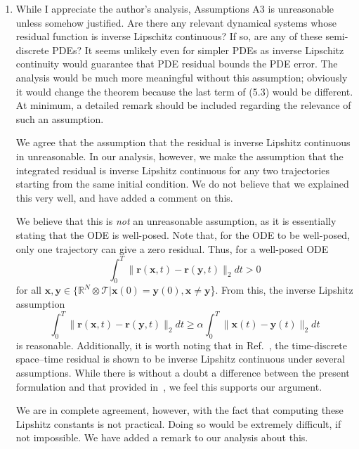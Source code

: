\documentclass[3p,computermodern,10pt]{elsarticle}
\begin{document}
\begin{enumerate}
\item While I appreciate the author's analysis, Assumptions A3 is unreasonable unless somehow justified. Are there any relevant dynamical systems whose residual function is inverse Lipschitz continuous? If so, are any of these semi-discrete PDEs? It seems unlikely even for simpler PDEs as inverse Lipschitz continuity would guarantee that PDE residual bounds the PDE error. The analysis would be much more meaningful without this assumption; obviously it would change the theorem because the last term of (5.3) would be different. At minimum, a detailed remark should be included regarding the relevance of such an assumption.

{\color{red} We agree that the assumption that the residual is inverse Lipshitz continuous in unreasonable. In our analysis, however, we make the assumption that the integrated residual is inverse Lipshitz continuous for any two trajectories starting from the same initial condition. We do not believe that we explained this very well, and have added a comment on this. 

We believe that this is \textit{not} an unreasonable assumption, as it is essentially stating that the ODE is well-posed. Note that, for the ODE to be well-posed, only one trajectory can give a zero residual. Thus, for a well-posed ODE 
$$ \int_0^T \| \boldsymbol r(\boldsymbol x,t) - \boldsymbol r(\boldsymbol y,t) \|_2 dt > 0 $$
for all $\boldsymbol x, \boldsymbol y \in \{ \mathbb{R}^N \otimes \mathcal{T} | \boldsymbol x(0) = \boldsymbol y(0), \boldsymbol x \ne \boldsymbol y$\}. From this, the inverse Lipshitz assumption 
$$ \int_0^T \| \boldsymbol r(\boldsymbol x,t) - \boldsymbol r(\boldsymbol y,t) \|_2 dt \ge \alpha \int_0^T \| \boldsymbol x(t) - \boldsymbol y(t) \|_2 dt$$
is reasonable. Additionally, it is worth noting that in Ref.~\cite{choi_stlspg}, the time-discrete space--time residual is shown to be inverse Lipshitz continuous under several assumptions. While there is without a doubt a difference between the present formulation and that provided in~\cite{choi_stlspg}, we feel this supports our argument. 

We are in complete agreement, however, with the fact that computing these Lipshitz constants is not practical. Doing so would be extremely difficult, if not impossible. We have added a remark to our analysis about this. 
} 


\end{enumerate}
\end{document}
